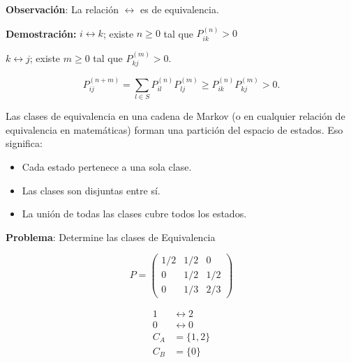 \documentclass[12pt,a4paper]{article}
\begin{document}
\textbf{Observación}: La relación $\leftrightarrow$ es de equivalencia.

\textbf{Demostración:} $i \leftrightarrow k$; existe $n \geq 0$ tal que $P_{ik}^{(n)} > 0$

$k \leftrightarrow j$; existe $m \geq 0$ tal que $P_{kj}^{(m)} > 0$.

\begin{equation*}
P_{ij}^{(n+m)} = \sum_{l \in S} P_{il}^{(n)} P_{lj}^{(m)} \geq P_{ik}^{(n)} P_{kj}^{(m)} > 0.
\end{equation*}


Las clases de equivalencia en una cadena de Markov (o en cualquier relación de equivalencia en matemáticas) forman una partición del espacio de estados. Eso significa:

\begin{itemize}
    \item Cada estado pertenece a una sola clase.
    \item Las clases son disjuntas entre sí.
    \item La unión de todas las clases cubre todos los estados.
\end{itemize}


\textbf{Problema}: Determine las clases de Equivalencia

\begin{equation*}
P = \begin{pmatrix}
1/2 & 1/2 & 0 \\
0 & 1/2 & 1/2 \\
0 & 1/3 & 2/3
\end{pmatrix}
\end{equation*}

\begin{center}
\end{center}


\begin{align*}
1 &\leftrightarrow 2 \\
0 &\leftrightarrow 0 \\
C_A &= \{1, 2\} \\
C_B &= \{0\}
\end{align*}
\end{document}

